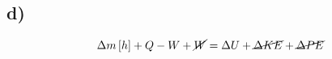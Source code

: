 

\subsection*{d)}
\[
\Delta m \left[ h \right] + Q - W + \cancel{W} = \Delta U + \cancel{\Delta KE} + \cancel{\Delta PE}
\]